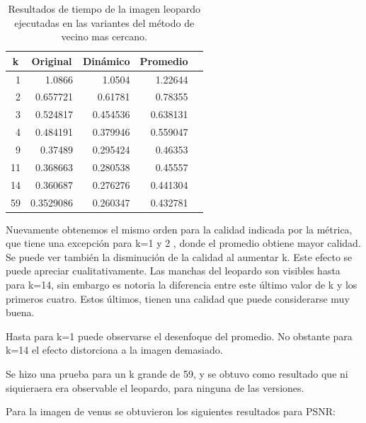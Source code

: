 \documentclass[a4paper]{article}
\newcounter{col}
\begin{document}
\begin{table}[H]
\centering
\begin{tabular}{|r|r|r|r|r|}
\hline
\multicolumn{1}{|c|}{k} & \multicolumn{1}{c|}{Original} & \multicolumn{1}{c|}{Dinámico} & \multicolumn{1}{c|}{Promedio} \\ \hline
1 & 1.0866 & 1.0504& 1.22644 \\ \hline
2 & 0.657721 &  0.61781 & 0.78355 \\ \hline
3 & 0.524817 &  0.454536& 0.638131 \\ \hline
4 &0.484191&  0.379946 &  0.559047 \\ \hline
9 & 0.37489& 0.295424& 0.46353 \\ \hline
11 & 0.368663 &   0.280538 & 0.45557 \\ \hline
14 & 0.360687 &   0.276276 &  0.441304 \\ \hline
59 &0.3529086&  0.260347 & 0.432781\\ \hline
\end{tabular}
\caption{Resultados de tiempo de la imagen leopardo ejecutadas en las variantes del m\'etodo de vecino mas cercano.}
\label{}
\end{table}

Nuevamente obtenemos el mismo orden para la calidad indicada por la métrica, que tiene una excepción para k=1 y 2 , donde el promedio obtiene mayor calidad.  Se puede ver también la disminución de la calidad al aumentar k. Este efecto se puede apreciar cualitativamente. Las manchas del leopardo son visibles hasta para k=14, sin embargo es notoria la diferencia entre este \'ultimo valor de k y los primeros cuatro. Estos \'ultimos, tienen una calidad que puede considerarse muy buena.

Hasta para k=1 puede observarse el desenfoque del promedio. No obstante para k=14 el efecto distorciona a la imagen demasiado.

Se hizo una  prueba para un k grande de 59, y se obtuvo como resultado que ni siquieraera era observable el leopardo, para ninguna de las versiones.


Para la imagen de venus se obtuvieron los siguientes resultados para PSNR:
\end{document}
